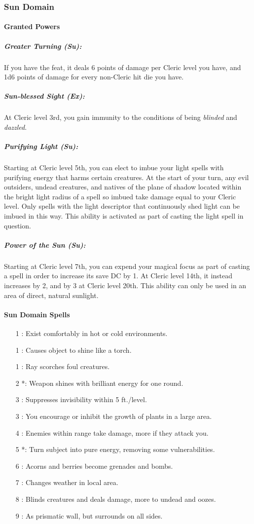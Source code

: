 \subsubsection{Sun Domain}
\paragraph{Granted Powers}
\subparagraph{Greater Turning (Su):} 
If you have the  feat, it deals 6 points of damage per Cleric level you have, and 1d6 points of damage for every non-Cleric hit die you have.
\subparagraph{Sun-blessed Sight (Ex):}
At Cleric level 3rd, you gain immunity to the conditions of being \emph{blinded} and \emph{dazzled}.
\subparagraph{Purifying Light (Su):}
Starting at Cleric level 5th, you can elect to imbue your light spells with purifying energy that harms certain creatures. At the start of your turn, any evil outsiders, undead creatures, and natives of the plane of shadow located within the bright light radius of a spell so imbued take damage equal to your Cleric level. Only spells with the light descriptor that continuously shed light can be imbued in this way. This ability is activated as part of casting the light spell in question.
\subparagraph{Power of the Sun (Su):}
Starting at Cleric level 7th, you can expend your magical focus as part of casting a spell in order to increase its save DC by 1.
At Cleric level 14th, it instead increases by 2, and by 3 at Cleric level 20th.
This ability can only be used in an area of direct, natural sunlight.
\paragraph{Sun Domain Spells}
\begin{itemize}
\item[1] : Exist comfortably in hot or cold environments.
\item[1] : Causes object to shine like a torch.
\item[1] : Ray scorches foul creatures.
\item[2] *: Weapon shines with brilliant energy for one round.
\item[3] : Suppresses invisibility within 5 ft./level.
\item[3] : You encourage or inhibit the growth of plants in a large area.
\item[4] : Enemies within range take damage, more if they attack you.
\item[5] *: Turn subject into pure energy, removing some vulnerabilities.
\item[6] : Acorns and berries become grenades and bombs.
\item[7] : Changes weather in local area.
\item[8] : Blinds creatures and deals damage, more to undead and oozes.
\item[9] : As prismatic wall, but surrounds on all sides.
\end{itemize}
